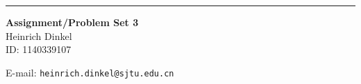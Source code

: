 \documentclass{article}
\begin{document}
\begin{CJK}{UTF8}{gbsn}


\hrule

\vspace{0.4in}
\begin{center}
{\bf Assignment/Problem Set 3\\}
\bigskip
Heinrich Dinkel\\
ID: 1140339107\\
\smallskip
\date
\bigskip

E-mail: {\tt heinrich.dinkel@sjtu.edu.cn}\\

\end{center}

\newcommand{\ppath}{.}


%
\newpage
\end{CJK}
\end{document}
